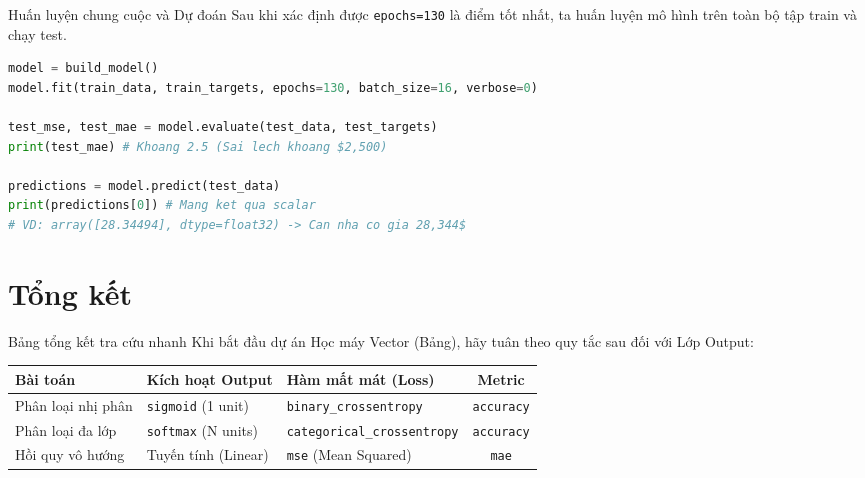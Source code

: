 \documentclass[aspectratio=169]{beamer}
\begin{document}
\begin{frame}[fragile]{Huấn luyện chung cuộc và Dự đoán}
    Sau khi xác định được \texttt{epochs=130} là điểm tốt nhất, ta huấn luyện mô hình trên toàn bộ tập train và chạy test.
\begin{lstlisting}[language=Python]
model = build_model()
model.fit(train_data, train_targets, epochs=130, batch_size=16, verbose=0)

test_mse, test_mae = model.evaluate(test_data, test_targets)
print(test_mae) # Khoang 2.5 (Sai lech khoang $2,500)

predictions = model.predict(test_data)
print(predictions[0]) # Mang ket qua scalar
# VD: array([28.34494], dtype=float32) -> Can nha co gia 28,344$
\end{lstlisting}
\end{frame}

\section{Tổng kết}

\begin{frame}{Bảng tổng kết tra cứu nhanh}
    Khi bắt đầu dự án Học máy Vector (Bảng), hãy tuân theo quy tắc sau đối với Lớp Output:
    \begin{table}[h]
        \centering
        \begin{tabular}{@{}lllc@{}}
        \toprule
        \textbf{Bài toán} & \textbf{Kích hoạt Output} & \textbf{Hàm mất mát (Loss)} & \textbf{Metric} \\ \midrule
        Phân loại nhị phân & \texttt{sigmoid} (1 unit) & \texttt{binary\_crossentropy} & \texttt{accuracy} \\ 
        Phân loại đa lớp & \texttt{softmax} (N units) & \texttt{categorical\_crossentropy} & \texttt{accuracy} \\ 
        Hồi quy vô hướng & Tuyến tính (Linear) & \texttt{mse} (Mean Squared) & \texttt{mae} \\ \bottomrule
        \end{tabular}
    \end{table}
\end{frame}
\end{document}
